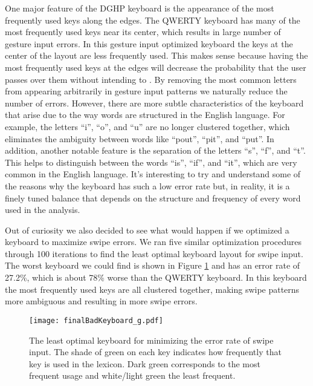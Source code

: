 \documentclass[final,1p,times,authoryear]{elsarticle}
\begin{document}
One major feature of the DGHP keyboard is the appearance
of the most frequently used keys along the edges. The QWERTY keyboard
has many of the most frequently used keys near its center, which results
in large number of gesture input errors. In this gesture input optimized keyboard
the keys at the center of the layout are less frequently used. This
makes sense because having the most frequently used keys at the edges
will decrease the probability that the user passes over them without
intending to . By removing the most common letters from appearing arbitrarily
in gesture input patterns we naturally reduce the number of errors.
However, there are more subtle characteristics of the keyboard that
arise due to the way words are structured in the English language.
For example, the letters ``i'', ``o'', and ``u'' are no longer
clustered together, which eliminates the ambiguity between words like
``pout'', ``pit'', and ``put''. In addition, another notable
feature is the separation of the letters ``s'', ``f'', and ``t''.
This helps to distinguish between the words ``is'', ``if'', and
``it'', which are very common in the English language. It's interesting
to try and understand some of the reasons why the keyboard has such
a low error rate but, in reality, it is a finely tuned balance that
depends on the structure and frequency of every word used in the analysis.

Out of curiosity we also decided to see what would happen if we optimized
a keyboard to maximize swipe errors. We ran five similar optimization
procedures through 100 iterations to find the least optimal keyboard
layout for swipe input. The worst keyboard we could find is shown
in Figure \ref{fig:The-least-optimal} and has an error rate of 27.2\%,
which is about 78\% worse than the QWERTY keyboard. In this keyboard
the most frequently used keys are all clustered together, making swipe
patterns more ambiguous and resulting in more swipe errors.

\begin{figure}[t]
\begin{centering}
\texttt{[image: finalBadKeyboard\_g.pdf]}
\par\end{centering}
\medskip{}
\protect\caption{The least optimal keyboard for minimizing the error rate of swipe
input. The shade of green on each key indicates how frequently that
key is used in the lexicon. Dark green corresponds to the most
frequent usage and white/light green the least frequent.\label{fig:The-least-optimal}}
\end{figure}
\end{document}
